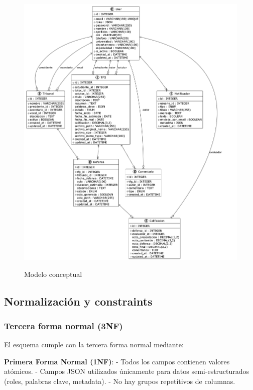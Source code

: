 \documentclass[12pt,a4paper,oneside]{report}
\providecommand{\pandocbounded}[1]{#1}
\begin{document}
\begin{figure}[H]
\centering
\pandocbounded{\includegraphics[keepaspectratio,alt={Modelo conceptual}]{processed/images/05_diseno_plantuml_3.png}}
\caption{Modelo conceptual}
\label{fig:modelo-conceptual}
\end{figure}

\subsection{Normalización y
constraints}\label{normalizaciuxf3n-y-constraints}

\subsubsection{Tercera forma normal
(3NF)}\label{tercera-forma-normal-3nf}

El esquema cumple con la tercera forma normal mediante:

\textbf{Primera Forma Normal (1NF)}: - Todos los campos contienen
valores atómicos. - Campos JSON utilizados únicamente para datos
semi-estructurados (roles, palabras clave, metadata). - No hay grupos
repetitivos de columnas.
\end{document}
